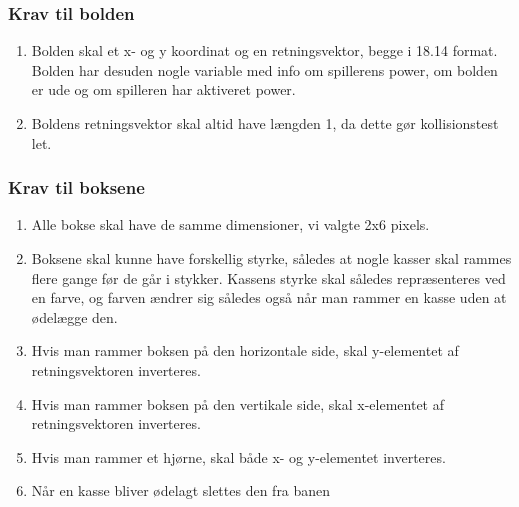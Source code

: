 \subsubsection{Krav til bolden}
\label{Ballkrav}
\begin{enumerate}
\item Bolden skal et x- og y koordinat og en retningsvektor, begge i 18.14 format. Bolden har desuden nogle variable med info om spillerens power, om bolden er ude og om spilleren har aktiveret power.
\item Boldens retningsvektor skal altid have længden 1, da dette gør kollisionstest let.
\end{enumerate}
\subsubsection{Krav til boksene}
\begin{enumerate}
\item Alle bokse skal have de samme dimensioner, vi valgte 2x6 pixels.
\item Boksene skal kunne have forskellig styrke, således at nogle kasser skal rammes flere gange før de går i stykker. Kassens styrke skal således repræsenteres ved en farve, og farven ændrer sig således også når man rammer en kasse uden at ødelægge den.
\item Hvis man rammer boksen på den horizontale side, skal y-elementet af retningsvektoren inverteres. 
\item Hvis man rammer boksen på den vertikale side, skal x-elementet af retningsvektoren inverteres.
\item Hvis man rammer et hjørne, skal både x- og y-elementet inverteres.
\item Når en kasse bliver ødelagt slettes den fra banen
\end{enumerate}



\subsection{}